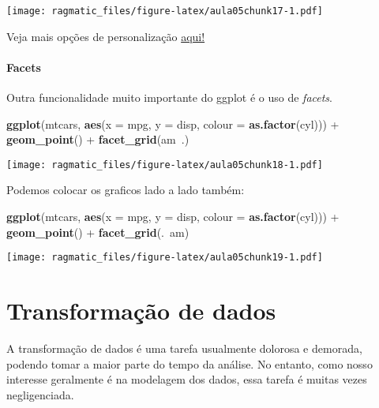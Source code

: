 \documentclass[]{book}
\newenvironment{Shaded}{\begin{snugshade}}{\end{snugshade}}
\newcommand{\KeywordTok}[1]{\textcolor[rgb]{0.13,0.29,0.53}{\textbf{{#1}}}}
\newcommand{\DataTypeTok}[1]{\textcolor[rgb]{0.13,0.29,0.53}{{#1}}}
\newcommand{\StringTok}[1]{\textcolor[rgb]{0.31,0.60,0.02}{{#1}}}
\newcommand{\NormalTok}[1]{{#1}}
\begin{document}
\texttt{[image: ragmatic\_files/figure-latex/aula05chunk17-1.pdf]}

Veja mais opções de personalização
\href{http://www.cookbook-r.com/Graphs/Legends_(ggplot2)/}{aqui!}

\subsubsection{Facets}\label{facets}

Outra funcionalidade muito importante do ggplot é o uso de
\emph{facets}.

\begin{Shaded}
\begin{Highlighting}[]
\KeywordTok{ggplot}\NormalTok{(mtcars, }\KeywordTok{aes}\NormalTok{(}\DataTypeTok{x =} \NormalTok{mpg, }\DataTypeTok{y =} \NormalTok{disp, }\DataTypeTok{colour =} \KeywordTok{as.factor}\NormalTok{(cyl))) +}\StringTok{ }
\StringTok{  }\KeywordTok{geom_point}\NormalTok{() +}\StringTok{ }
\StringTok{  }\KeywordTok{facet_grid}\NormalTok{(am~.)}
\end{Highlighting}
\end{Shaded}

\texttt{[image: ragmatic\_files/figure-latex/aula05chunk18-1.pdf]}

Podemos colocar os graficos lado a lado também:

\begin{Shaded}
\begin{Highlighting}[]
\KeywordTok{ggplot}\NormalTok{(mtcars, }\KeywordTok{aes}\NormalTok{(}\DataTypeTok{x =} \NormalTok{mpg, }\DataTypeTok{y =} \NormalTok{disp, }\DataTypeTok{colour =} \KeywordTok{as.factor}\NormalTok{(cyl))) +}
\StringTok{  }\KeywordTok{geom_point}\NormalTok{() +}\StringTok{ }
\StringTok{  }\KeywordTok{facet_grid}\NormalTok{(.~am)}
\end{Highlighting}
\end{Shaded}

\texttt{[image: ragmatic\_files/figure-latex/aula05chunk19-1.pdf]}

\chapter{Transformação de dados}\label{transformacao-de-dados}

A transformação de dados é uma tarefa usualmente dolorosa e demorada,
podendo tomar a maior parte do tempo da análise. No entanto, como nosso
interesse geralmente é na modelagem dos dados, essa tarefa é muitas
vezes negligenciada.
\end{document}
